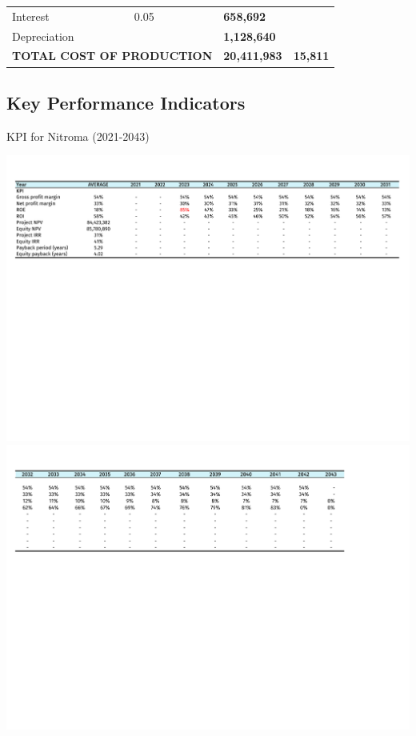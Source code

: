 \begin{table}[H]
\begin{tabular}{@{}llllll@{}}
Interest                      & 0.05                  &                                       &                           & \textbf{658,692}           &                      \\
Depreciation                  &                       &                                       &                           & \textbf{1,128,640}         &                      \\ \cline{5-6} 
\multicolumn{4}{l}{\textbf{TOTAL COST OF PRODUCTION}}                                                                     & \textbf{20,411,983}        & \textbf{15,811}     
\end{tabular}
\end{table}

\begin{landscape}
\subsection{Key Performance Indicators}
\begin{table}[H]
\label{tab:KPI}
  \caption{KPI for Nitroma (2021-2043)}
\includegraphics[clip, trim=0cm 12cm 0cm 1cm, width=\linewidth]{chapters/Z-support/attachments/KPI1.pdf} \\

\includegraphics[clip, trim=0cm 12cm 0cm 1cm, width=\linewidth]{chapters/Z-support/attachments/KPI2.pdf}
\end{table}
\end{landscape}

